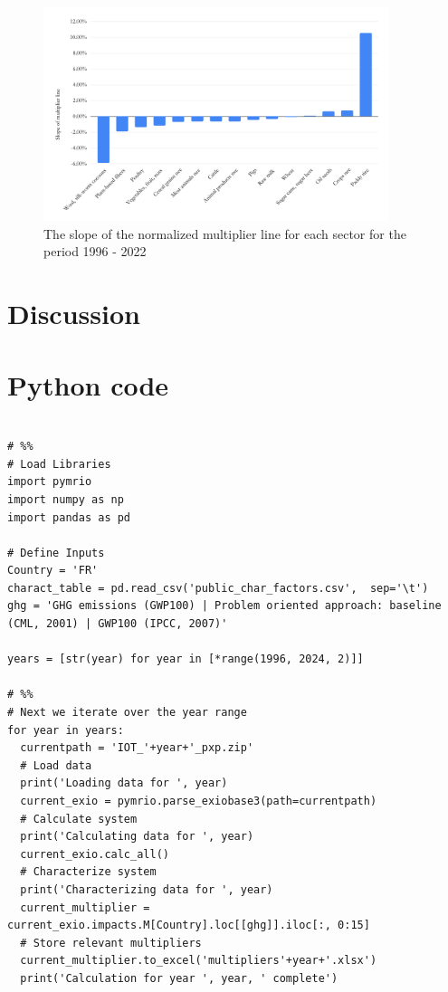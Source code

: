 \documentclass[a4paper,twoside]{article}
\begin{document}
\begin{figure}[H]
\centering
\includegraphics[width=0.9\textwidth]{slope}
\caption{The slope of the normalized multiplier line for each sector for the period 1996 - 2022}\label{fig:slope} 
\end{figure}


\section{Discussion}



\appendix

\section{Python code}

\begin{lstlisting}

# %%
# Load Libraries
import pymrio
import numpy as np
import pandas as pd

# Define Inputs
Country = 'FR'
charact_table = pd.read_csv('public_char_factors.csv',  sep='\t')
ghg = 'GHG emissions (GWP100) | Problem oriented approach: baseline (CML, 2001) | GWP100 (IPCC, 2007)'

years = [str(year) for year in [*range(1996, 2024, 2)]]

# %%
# Next we iterate over the year range
for year in years:
  currentpath = 'IOT_'+year+'_pxp.zip'
  # Load data
  print('Loading data for ', year)
  current_exio = pymrio.parse_exiobase3(path=currentpath)
  # Calculate system
  print('Calculating data for ', year)
  current_exio.calc_all()
  # Characterize system
  print('Characterizing data for ', year)
  current_multiplier = current_exio.impacts.M[Country].loc[[ghg]].iloc[:, 0:15]
  # Store relevant multipliers
  current_multiplier.to_excel('multipliers'+year+'.xlsx')
  print('Calculation for year ', year, ' complete')
  
\end{lstlisting}
\end{document}
